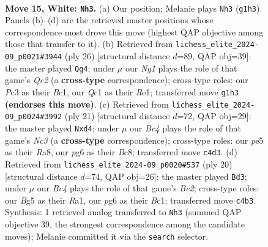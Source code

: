 \documentclass[11pt]{article}
\begin{document}
\clearpage

\begin{figure}[p]\centering
\begin{subfigure}{0.46\textwidth}\centering
\resizebox{\linewidth}{!}{%
\newchessgame
\chessboard[
  setfen={r1b1r1k1/1pqn1pbp/p5p1/2pPp1B1/2B1P3/2P5/P4PPP/R1Q1K1NR w - - 0 15},
  showmover=false,
  pgfstyle=straightmove, color=movearrow, markmove={g1-h3}
]}
\caption{}
\end{subfigure}\hfill
\begin{subfigure}{0.46\textwidth}\centering
\resizebox{\linewidth}{!}{%
\newchessgame
\chessboard[
  setfen={r1b1k2r/p1q1bpp1/2n1p2p/2ppP3/8/1PPB4/P2NQPPP/R1B1R1K1 w kq - 1 14},
  showmover=false,
  pgfstyle=straightmove, color=movearrow, markmove={e2-g4}
]}
\caption{}
\end{subfigure}
\\[4pt]
\begin{subfigure}{0.46\textwidth}\centering
\resizebox{\linewidth}{!}{%
\newchessgame
\chessboard[
  setfen={r1bqkb1r/1pp2pp1/p1n4p/7P/2PPp3/1P6/PB1P1PP1/RN1QKB1R b KQkq - 0 11},
  showmover=false,
  pgfstyle=straightmove, color=movearrow, markmove={c6-d4}
]}
\caption{}
\end{subfigure}\hfill
\begin{subfigure}{0.46\textwidth}\centering
\resizebox{\linewidth}{!}{%
\newchessgame
\chessboard[
  setfen={r1b1kb1r/2q2ppp/p1p1pn2/8/Pp2P3/8/1PP1BPPP/RNBQ1RK1 w kq - 2 11},
  showmover=false,
  pgfstyle=straightmove, color=movearrow, markmove={e2-d3}
]}
\caption{}
\end{subfigure}
\caption{\textbf{Move 15, White: \texttt{Nh3}.} (a) Our position; Melanie plays \texttt{Nh3} (\texttt{g1h3}). Panels (b)--(d) are the retrieved master positions whose correspondence most drove this move (highest QAP objective among those that transfer to it). (b) Retrieved from \texttt{lichess\_elite\_2024-09\_p0021\#3944} (ply 26) [structural distance $d$=89, QAP obj=39]: the master played \texttt{Qg4}; under $\mu$ our \emph{Ng1} plays the role of that game's \emph{Qe2} (a \textbf{cross-type} correspondence); cross-type roles: our \emph{P}c3 as their \emph{B}c1, our \emph{Q}c1 as their \emph{R}e1; transferred move \texttt{g1h3} \textbf{(endorses this move)}. (c) Retrieved from \texttt{lichess\_elite\_2024-09\_p0024\#3992} (ply 21) [structural distance $d$=72, QAP obj=29]: the master played \texttt{Nxd4}; under $\mu$ our \emph{Bc4} plays the role of that game's \emph{Nc3} (a \textbf{cross-type} correspondence); cross-type roles: our \emph{p}e5 as their \emph{R}a8, our \emph{p}g6 as their \emph{B}c8; transferred move \texttt{c4d3}. (d) Retrieved from \texttt{lichess\_elite\_2024-09\_p0020\#537} (ply 20) [structural distance $d$=74, QAP obj=26]: the master played \texttt{Bd3}; under $\mu$ our \emph{Bc4} plays the role of that game's \emph{Be2}; cross-type roles: our \emph{B}g5 as their \emph{R}a1, our \emph{p}g6 as their \emph{B}c1; transferred move \texttt{c4b3}. Synthesis: 1 retrieved analog transferred to \texttt{Nh3} (summed QAP objective 39, the strongest correspondence among the candidate moves); Melanie committed it via the \texttt{search} selector.}
\label{fig:thought-m28}
\end{figure}
\end{document}
